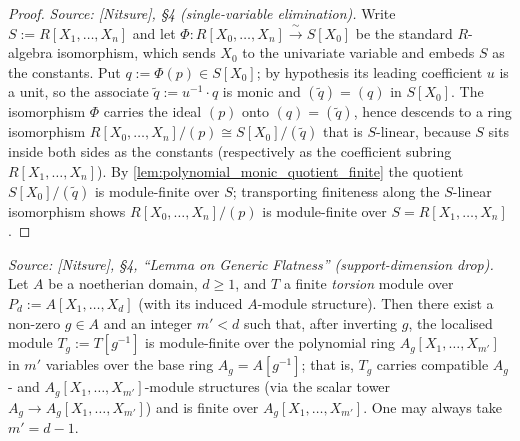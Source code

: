 \begin{proof}

\leanok
  \textit{Source: [Nitsure], \S4 (single-variable elimination).}
  Write \(S := R[X_1, \dots, X_n]\) and let
  \(\Phi : R[X_0, \dots, X_n] \xrightarrow{\ \sim\ } S[X_0]\) be the standard \(R\)-algebra
  isomorphism, which sends \(X_0\) to the univariate variable and embeds \(S\) as the constants. Put \(q := \Phi(p) \in S[X_0]\); by hypothesis its leading
  coefficient \(u\) is a unit, so the associate \(\tilde q := u^{-1} \cdot q\) is monic and
  \((\tilde q) = (q)\) in \(S[X_0]\). The isomorphism \(\Phi\) carries the ideal \((p)\) onto
  \((q) = (\tilde q)\), hence descends to a ring isomorphism
  \(R[X_0, \dots, X_n]/(p) \cong S[X_0]/(\tilde q)\) that is \(S\)-linear, because \(S\) sits
  inside both sides as the constants (respectively as the coefficient subring
  \(R[X_1, \dots, X_n]\)). By \cref{lem:polynomial_monic_quotient_finite} the quotient
  \(S[X_0]/(\tilde q)\) is module-finite over \(S\); transporting finiteness along the
  \(S\)-linear isomorphism shows \(R[X_0, \dots, X_n]/(p)\) is module-finite over
  \(S = R[X_1, \dots, X_n]\).
\end{proof}

\begin{lemma}


  \label{lem:gf_torsion_reindex}
  \textit{Source: [Nitsure], \S4, ``Lemma on Generic Flatness'' (support-dimension drop).}
  Let \(A\) be a noetherian domain, \(d \ge 1\), and \(T\) a finite \emph{torsion} module
  over \(P_d := A[X_1, \dots, X_d]\) (with its induced \(A\)-module structure). Then there
  exist a non-zero \(g \in A\) and an integer \(m' < d\) such that, after inverting \(g\),
  the localised module \(T_g := T[g^{-1}]\) is module-finite over the polynomial ring
  \(A_g[X_1, \dots, X_{m'}]\) in \(m'\) variables over the base ring \(A_g = A[g^{-1}]\);
  that is, \(T_g\) carries compatible \(A_g\)- and \(A_g[X_1, \dots, X_{m'}]\)-module
  structures (via the scalar tower \(A_g \to A_g[X_1, \dots, X_{m'}]\)) and is finite over
  \(A_g[X_1, \dots, X_{m'}]\). One may always take \(m' = d - 1\).
\end{lemma}

